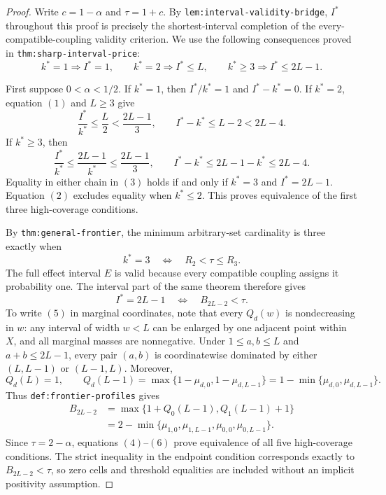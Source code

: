 \documentclass{article}
\begin{document}
\begin{proof}
Write \(c=1-\alpha\) and \(\tau=1+c\).  By \texttt{lem:interval-validity-bridge}, \(I^*\) throughout this proof is precisely the shortest-interval completion of the every-compatible-coupling validity criterion.  We use the following consequences proved in \texttt{thm:sharp-interval-price}:
\[
k^*=1\Longrightarrow I^*=1,
\qquad
k^*=2\Longrightarrow I^*\leq L,
\qquad
k^*\geq3\Longrightarrow I^*\leq2L-1.
\tag{1}
\]

First suppose \(0<\alpha<1/2\).  If \(k^*=1\), then \(I^*/k^*=1\) and \(I^*-k^*=0\).  If \(k^*=2\), equation \((1)\) and \(L\geq3\) give
\[
\frac{I^*}{k^*}\leq\frac L2<\frac{2L-1}{3},
\qquad
I^*-k^*\leq L-2<2L-4.
\tag{2}
\]
If \(k^*\geq3\), then
\[
\frac{I^*}{k^*}\leq\frac{2L-1}{k^*}\leq\frac{2L-1}{3},
\qquad
I^*-k^*\leq2L-1-k^*\leq2L-4.
\tag{3}
\]
Equality in either chain in \((3)\) holds if and only if \(k^*=3\) and \(I^*=2L-1\).  Equation \((2)\) excludes equality when \(k^*\leq2\).  This proves equivalence of the first three high-coverage conditions.

By \texttt{thm:general-frontier}, the minimum arbitrary-set cardinality is three exactly when
\[
k^*=3
\quad\Longleftrightarrow\quad
R_2<\tau\leq R_3.
\tag{4}
\]
The full effect interval \(E\) is valid because every compatible coupling assigns it probability one.  The interval part of the same theorem therefore gives
\[
I^*=2L-1
\quad\Longleftrightarrow\quad
B_{2L-2}<\tau.
\tag{5}
\]
To write \((5)\) in marginal coordinates, note that every \(Q_d(w)\) is nondecreasing in \(w\): any interval of width \(w<L\) can be enlarged by one adjacent point within \(X\), and all marginal masses are nonnegative.  Under \(1\leq a,b\leq L\) and \(a+b\leq2L-1\), every pair \((a,b)\) is coordinatewise dominated by either \((L,L-1)\) or \((L-1,L)\).  Moreover,
\[
Q_d(L)=1,
\qquad
Q_d(L-1)
=\max\{1-\mu_{d,0},1-\mu_{d,L-1}\}
=1-\min\{\mu_{d,0},\mu_{d,L-1}\}.
\]
Thus \texttt{def:frontier-profiles} gives
\[
\begin{aligned}
B_{2L-2}
&=\max\{1+Q_0(L-1),Q_1(L-1)+1\}\\
&=2-\min\{\mu_{1,0},\mu_{1,L-1},\mu_{0,0},\mu_{0,L-1}\}.
\end{aligned}
\tag{6}
\]
Since \(\tau=2-\alpha\), equations \((4)\)--\((6)\) prove equivalence of all five high-coverage conditions.  The strict inequality in the endpoint condition corresponds exactly to \(B_{2L-2}<\tau\), so zero cells and threshold equalities are included without an implicit positivity assumption.


\end{proof}
\end{document}

